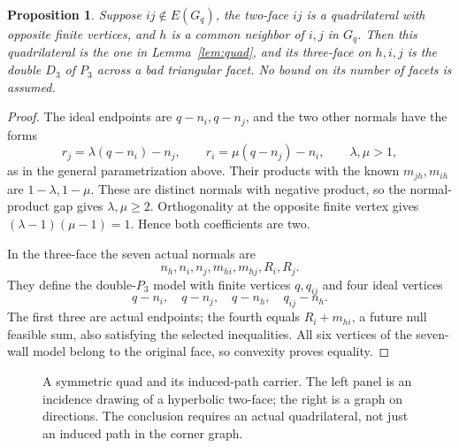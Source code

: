 \documentclass[11pt]{article}
\newtheorem{proposition}[theorem]{Proposition}
\theoremstyle{definition}\newtheorem{definition}[theorem]{Definition}
\theoremstyle{remark}\newtheorem{remark}[theorem]{Remark}
\newcommand{\Pthree}{P_3}
\newcommand{\Dthree}{D_3}
\begin{document}
\begin{proposition}\label{prop:common}
Suppose \(ij\notin E(G_q)\), the two-face \(ij\) is a
quadrilateral with opposite finite vertices, and \(h\) is a common
neighbor of \(i,j\) in \(G_q\). Then this quadrilateral is the
one in Lemma~\ref{lem:quad}, and its three-face on \(h,i,j\)
is the double \(\Dthree\) of \(\Pthree\) across a bad triangular
facet. No bound on its number of facets is assumed.
\end{proposition}
\begin{proof}
The ideal endpoints are \(q-n_i,q-n_j\), and the two other
normals have the forms
\[
 r_j=\lambda(q-n_i)-n_j,\qquad
 r_i=\mu(q-n_j)-n_i,\qquad \lambda,\mu>1,
\]
as in the general parametrization above. Their products with the
known \(m_{jh},m_{ih}\) are \(1-\lambda,1-\mu\).
These are distinct normals with negative product, so the
normal-product gap gives \(\lambda,\mu\ge2\). Orthogonality
at the opposite finite vertex gives
\((\lambda-1)(\mu-1)=1\). Hence both coefficients are two.

In the three-face the seven actual normals are
\[
 n_h,n_i,n_j,m_{hi},m_{hj},R_i,R_j.
\]
They define the double-\(\Pthree\) model with finite vertices
\(q,q_{ij}\) and four ideal vertices
\[
 q-n_i,\quad q-n_j,\quad q-n_h,\quad q_{ij}-n_h.
\]
The first three are actual endpoints; the fourth equals
\(R_i+m_{hi}\), a future null feasible sum, also satisfying the
selected inequalities. All six vertices of the seven-wall model
belong to the original face, so convexity proves equality.
\end{proof}

\begin{figure}[ht]
\centering
{}
\caption{A symmetric quad and its induced-path carrier. The left
panel is an incidence drawing of a hyperbolic two-face; the right is
a graph on directions. The conclusion requires an actual
quadrilateral, not just an induced path in the corner graph.}
\label{fig:quad}
\end{figure}
\end{document}
